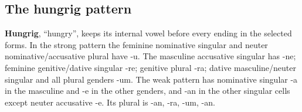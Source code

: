 \subsection*{The hungrig pattern}

\textbf{Hungrig}, “hungry”, keeps its internal vowel before every ending in the selected forms. In the strong pattern the feminine nominative singular and neuter nominative/\allowbreak{}accusative plural have -u. The masculine accusative singular has -ne; feminine genitive/\allowbreak{}dative singular -re; genitive plural -ra; dative masculine/\allowbreak{}neuter singular and all plural genders -um. The weak pattern has nominative singular -a in the masculine and -e in the other genders, and -an in the other singular cells except neuter accusative -e. Its plural is -an, -ra, -um, -an.

